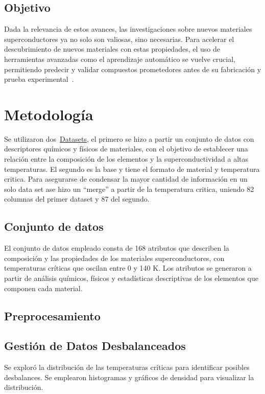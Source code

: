 \documentclass[conference]{IEEEtran} %
\begin{document}
\subsection{Objetivo}
Dada la relevancia de estos avances, las investigaciones sobre nuevos materiales 
superconductores ya no solo son valiosas, sino necesarias. Para acelerar el 
descubrimiento de nuevos materiales con estas propiedades, el uso de herramientas 
avanzadas como el aprendizaje automático se vuelve crucial, permitiendo predecir 
y validar compuestos prometedores antes de su fabricación y prueba experimental~\cite{coll2017superconductividad}.

\section{Metodología}
Se utilizaron dos~\href{https://www.kaggle.com/datasets/tunguz/superconductivty-data-data-set/code}{Datasets}, 
el primero se hizo a partir un conjunto de datos con descriptores químicos y 
físicos de materiales, con el objetivo de establecer una relación entre la 
composición de los elementos y la superconductividad a altas 
temperaturas. El segundo es la base y tiene el formato de material y temperatura critica.
Para asegurarse de condensar la mayor cantidad de información en un solo data set ase hizo 
un ``merge'' a partir de la temperatura critica, uniendo 82 columnas
del primer dataset y 87 del segundo.
 
\subsection{Conjunto de datos}
El conjunto de datos empleado consta de 168 atributos que describen la 
composición y las propiedades de los materiales superconductores, con 
temperaturas críticas que oscilan entre 0 y 140 K. Los atributos se 
generaron a partir de análisis químicos, físicos y estadísticas 
descriptivas de los elementos que componen cada material.

\subsection{Preprocesamiento}

\subsection{Gestión de Datos Desbalanceados} Se exploró la distribución de 
las temperaturas críticas para identificar posibles desbalances. 
Se emplearon histogramas y gráficos de densidad para visualizar 
la distribución.
\end{document}
